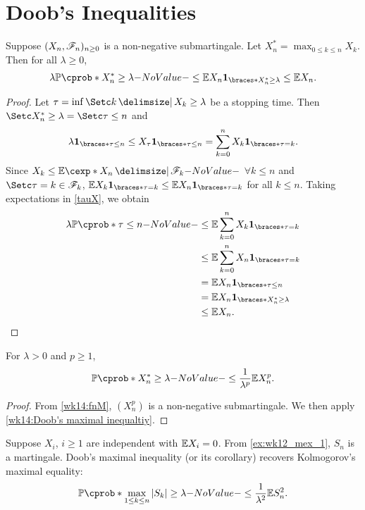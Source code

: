 \documentclass[12pt]{article}
\begin{document}
\section{Doob's Inequalities}

\begin{Theorem}\label{wk14:Doob's maximal inequaltiy}
Suppose $(X_n,\mathscr{F}_n)_{n\geq0}$ is a non-negative submartingale. Let $X_n^* = \max_{0\leq k \leq n} X_k$. Then for all $\lambda \geq 0$, 
\begin{align}
\lambda \P(X_n^* \geq \lambda) \leq \E X_n\indicator{X_n^*\geq\lambda} \leq \E X_n.
\end{align}
\end{Theorem}
\begin{proof}
Let $\tau = \inf\set{k \given X_k\geq\lambda}$ be a stopping time. Then $\set{X_n^* \geq\lambda} = \set{\tau\leq n}$ and
\begin{align}\label{tauX}
\lambda \indicator{\tau\leq n} \leq X_\tau \indicator{\tau \leq n} = \sum_{k=0}^n X_k\indicator{\tau=k}.
\end{align}
Since $X_k \leq \E[X_n \given \scF_k]$ $\forall k \leq n$ and $\set{\tau=k}\in\scF_k$, $\E X_k\indicator{\tau=k} \leq \E X_n\indicator{\tau=k}$ for all $k \leq n$. Taking expectations in \cref{tauX}, we obtain
\begin{align*}
\lambda \P(\tau\leq n) 
&\leq \E\sum_{k=0}^n X_k\indicator{\tau=k} \\
&\leq \E\sum_{k=0}^n X_n\indicator{\tau=k} \\
&= \E X_n\indicator{\tau\leq n} \\
&= \E X_n \indicator{X_n^*\geq\lambda}\\
&\leq \E X_n.
\end{align*}
\end{proof}

\begin{Corollary}
For $\lambda>0$ and $p\geq 1$,
\begin{align*}
\P(X_n^* \geq\lambda) \leq \ofrac{\lambda^p} \E X_n^p.
\end{align*}
\end{Corollary}
\begin{proof}
From \cref{wk14:fnM}, $(X_n^p)$ is a non-negative submartingale. We then apply \cref{wk14:Doob's maximal inequaltiy}.
\end{proof}

\begin{Example}
Suppose $X_i$, $i\geq1$ are independent with $\E X_i=0$. From \cref{ex:wk12_mex_1}, $S_n$ is a martingale. Doob's maximal inequality (or its corollary) recovers Kolmogorov's maximal equality:
\begin{align*}
\P(\max_{1\leq k\leq n} |S_k| \geq \lambda) \leq \ofrac{\lambda^2} \E S_n^2.
\end{align*}
\end{Example}
\end{document}
